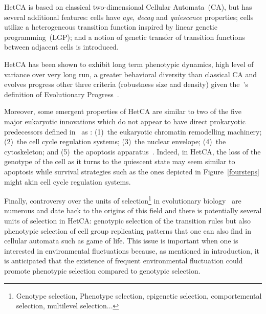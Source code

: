HetCA is based on classical two-dimensional Cellular Automata~(CA), but has several additional features: cells have \emph{age}, \emph{decay} and \emph{quiescence} properties; cells utilize a heterogeneous transition function inspired by linear genetic programming~(LGP); and  a notion of genetic transfer of transition functions between adjacent cells is introduced.

HetCA has been shown to exhibit long term phenotypic dynamics, high level of variance over very long run, a greater behavioral diversity than classical CA and evolves progress other three criteria (robustness size and density) given the~\cite{shanahan2012evolutionary}'s definition of Evolutionary Progress~\citep{medernach2015evolutionary}.

Moreover, some emergent properties of HetCA are similar to two of the five major eukaryotic innovations which do not appear to have direct prokaryotic predecessors defined in~\citep{smith1997major} as : (1)~the eukaryotic chromatin remodelling machinery; (2)~the cell cycle regulation systems; (3)~the nuclear envelope; (4)~the cytoskeleton; and (5)~the apoptosis apparatus~\citep{koonin2002origin}. Indeed, in HetCA, the loss of the genotype of the cell as it turns to the quiescent state may seem similar to apoptosis while survival strategies such as the ones depicted in Figure~\ref{foursteps} might akin cell cycle regulation systems.

Finally, controversy over the units of selection\footnote{Genotype selection, Phenotype selection, epigenetic selection, comportemental selection, multilevel selection...} in evolutionary biology~\citep{okasha2006evolution} are numerous and date back to the origins of this field  and there is potentially several units of selection in HetCA: genotypic selection of the transition rules but also phenotypic selection of cell group replicating patterns that one can also find in cellular automata such as game of life.  This issue is important when one is interested in environmental fluctuations because, as mentioned in introduction, it is anticipated that the existence of frequent environmental fluctuation could promote phenotypic selection compared to genotypic selection.


